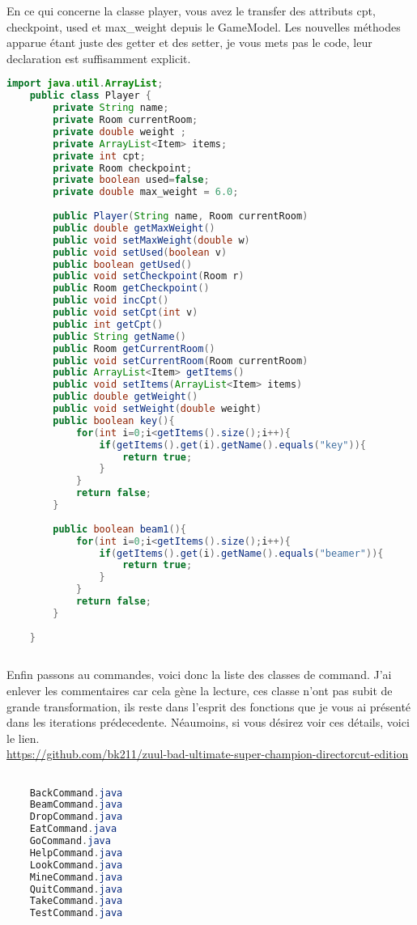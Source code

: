 \documentclass[a4paper , 10pt]{article}
\begin{document}
En ce qui concerne la classe player, vous avez le transfer des attributs cpt, checkpoint, used et max\_weight depuis le GameModel.
Les nouvelles méthodes apparue étant juste des getter et des setter, je vous mets pas le code, leur declaration est suffisamment explicit.
\begin{lstlisting}[language=Java, caption={Player}]
    import java.util.ArrayList;
    public class Player {
        private String name;
        private Room currentRoom;
        private double weight ;
        private ArrayList<Item> items;
        private int cpt;
        private Room checkpoint;
        private boolean used=false;
        private double max_weight = 6.0;
    
        public Player(String name, Room currentRoom)
        public double getMaxWeight()
        public void setMaxWeight(double w)
        public void setUsed(boolean v)
        public boolean getUsed()
        public void setCheckpoint(Room r)
        public Room getCheckpoint()
        public void incCpt()
        public void setCpt(int v)
        public int getCpt()
        public String getName()
        public Room getCurrentRoom()
        public void setCurrentRoom(Room currentRoom)
        public ArrayList<Item> getItems()
        public void setItems(ArrayList<Item> items)
        public double getWeight()
        public void setWeight(double weight)
        public boolean key(){
            for(int i=0;i<getItems().size();i++){
                if(getItems().get(i).getName().equals("key")){
                    return true;
                }
            }
            return false;
        }
    
        public boolean beam1(){
            for(int i=0;i<getItems().size();i++){
                if(getItems().get(i).getName().equals("beamer")){
                    return true;
                }
            }
            return false;
        }
    
    }
    
\end{lstlisting}

Enfin passons au commandes, voici donc la liste des classes de command.
J'ai enlever les commentaires car cela gène la lecture, ces classe n'ont pas subit de grande transformation, ils reste dans l'esprit des fonctions que je vous ai présenté dans les iterations 
prédecedente. Néaumoins, si vous désirez voir ces détails, voici le lien.\\
\url{https://github.com/bk211/zuul-bad-ultimate-super-champion-directorcut-edition}
\begin{lstlisting}[language=Java, caption={Liste de commande}]

    BackCommand.java
    BeamCommand.java
    DropCommand.java
    EatCommand.java
    GoCommand.java
    HelpCommand.java
    LookCommand.java
    MineCommand.java
    QuitCommand.java
    TakeCommand.java
    TestCommand.java
\end{lstlisting}
\end{document}
